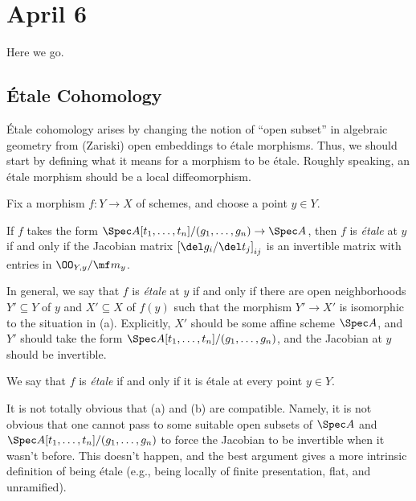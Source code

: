 \documentclass[../notes.tex]{subfiles}
\begin{document}
\section{April 6}
Here we go.

\subsection{\'Etale Cohomology}
\'Etale cohomology arises by changing the notion of ``open subset'' in algebraic geometry from (Zariski) open embeddings to \'etale morphisms. Thus, we should start by defining what it means for a morphism to be \'etale. Roughly speaking, an \'etale morphism should be a local diffeomorphism.
\begin{defihelper}[\'etale] 
	Fix a morphism $f\colon Y\to X$ of schemes, and choose a point $y\in Y$.
	\begin{listalph}
		\item If $f$ takes the form $\Spec A[t_1,\ldots,t_n]/(g_1,\ldots,g_n)\to\Spec A$, then $f$ is \textit{\'etale} at $y$ if and only if the Jacobian matrix $\left[\del g_i/\del t_j\right]_{ij}$ is an invertible matrix with entries in $\OO_{Y,y}/\mf m_y$.
		\item In general, we say that $f$ is \textit{\'etale} at $y$ if and only if there are open neighborhoods $Y'\subseteq Y$ of $y$ and $X'\subseteq X$ of $f(y)$ such that the morphism $Y'\to X'$ is isomorphic to the situation in (a). Explicitly, $X'$ should be some affine scheme $\Spec A$, and $Y'$ should take the form $\Spec A[t_1,\ldots,t_n]/(g_1,\ldots,g_n)$, and the Jacobian at $y$ should be invertible.
	\end{listalph}
	We say that $f$ is \textit{\'etale} if and only if it is \'etale at every point $y\in Y$.
\end{defihelper}
\begin{remark}
	It is not totally obvious that (a) and (b) are compatible. Namely, it is not obvious that one cannot pass to some suitable open subsets of $\Spec A$ and $\Spec A[t_1,\ldots,t_n]/(g_1,\ldots,g_n)$ to force the Jacobian to be invertible when it wasn't before. This doesn't happen, and the best argument gives a more intrinsic definition of being \'etale (e.g., being locally of finite presentation, flat, and unramified).
\end{remark}
\end{document}
